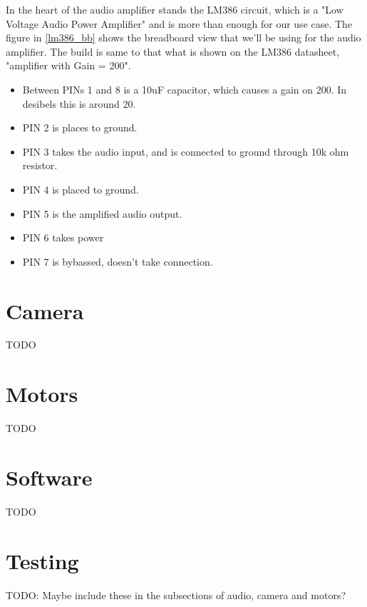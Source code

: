 \documentclass[english,11pt,twoside,a4paper]{article}
\begin{document}
In the heart of the audio amplifier stands the LM386 circuit, which is a "Low Voltage Audio Power Amplifier" and is more than enough for our use case. The figure in \ref{lm386_bb} shows the breadboard view that we'll be using for the audio amplifier. The build is same to that what is shown on the LM386 datasheet, "amplifier with Gain = 200". 

\begin{itemize}
  \item Between PINs 1 and 8 is a 10uF capacitor, which causes a gain on 200. In desibels this is around 20. 
  \item PIN 2 is places to ground.
  \item PIN 3 takes the audio input, and is connected to ground through 10k ohm resistor.
  \item PIN 4 is placed to ground.
  \item PIN 5 is the amplified audio output.
  \item PIN 6 takes power
  \item PIN 7 is bybassed, doesn't take connection.
\end{itemize}

\section{Camera}
TODO

\section{Motors}
TODO

\section{Software}
TODO

\section{Testing}
TODO: Maybe include these in the subsections of audio, camera and motors?
\end{document}
